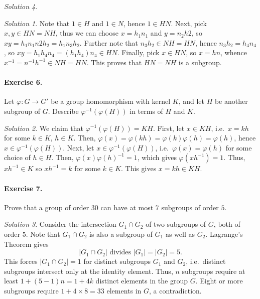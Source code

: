 \documentclass[11pt]{report}
\theoremstyle{remark}
\newtheorem*{solution}{Solution}
\begin{document}
\begin{solution}
\begin{solution}
        Note that $1 \in H$ and $1 \in N$, hence $1 \in HN$. Next, pick $x, y \in HN
        = NH$, thus we can choose $x = h_1n_1$ and $y = n_2h2$, so $xy = h_1n_1n2h_2
        = h_1n_3h_2$. Further note that $n_3h_2 \in NH = HN$, hence $n_3h_2 =
        h_4n_4$, so $xy = h_1h_4n_4 = (h_1h_4)n_4 \in HN$. Finally, pick $x \in HN$,
        so $x = hn$, whence $x^{-1} = n^{-1}h^{-1} \in NH = HN$. This proves that
        $HN = NH$ is a subgroup.
    \end{solution}
    
    \paragraph{Exercise 6.} Let $\varphi\colon G \to G'$ be a group homomorphism
    with kernel $K$, and let $H$ be another subgroup of $G$. Describe
    $\varphi^{-1}(\varphi(H))$ in terms of $H$ and $K$.
    \begin{solution}
        We claim that $\varphi^{-1}(\varphi(H)) = KH$. First, let $x \in KH$, i.e.\
        $x = kh$ for some $k \in K$, $h \in K$. Then, $\varphi(x) = \varphi(kh) =
        \varphi(k)\varphi(h) = \varphi(h)$, hence $x \in \varphi^{-1}(\varphi(H))$.
        Next, let $x \in \varphi^{-1}(\varphi(H))$, i.e.\ $\varphi(x) = \varphi(h)$
        for some choice of $h \in H$. Then, $\varphi(x)\varphi(h)^{-1} = 1$, which
        gives $\varphi(xh^{-1}) = 1$. Thus, $xh^{-1} \in K$ so $xh^{-1} = k$ for
        some $k \in K$. This gives $x = kh \in KH$.
    \end{solution}

    \paragraph{Exercise 7.} Prove that a group of order $30$ can have at most $7$
    subgroups of order $5$.
    \begin{solution}
        Consider the intersection $G_1 \cap G_2$ of two subgroups of $G$, both of
        order $5$. Note that $G_1 \cap G_2$ is also a subgroup of $G_1$ as well as
        $G_2$. Lagrange's Theorem gives \[
            |G_1 \cap G_2| \text{ divides } |G_1| = |G_2| = 5.
        \] This forces $|G_1 \cap G_2| = 1$ for distinct subgroups $G_1$ and $G_2$,
        i.e.\ distinct subgroups intersect only at the identity element. Thus, $n$
        subgroups require at least $1 + (5 - 1)n = 1 + 4k$ distinct elements in the
        group $G$. Eight or more subgroups require $1 + 4\times 8 = 33$ elements in
        $G$, a contradiction.
    \end{solution}
    

\end{solution}
\end{document}
